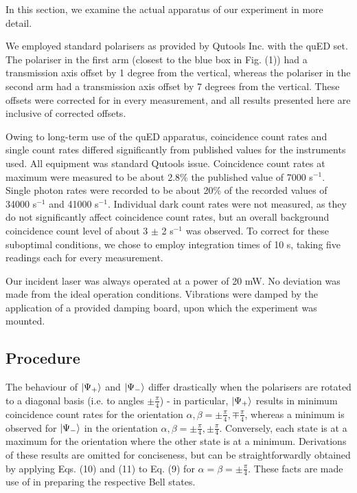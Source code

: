 \documentclass[aps,prl,nofootinbib,twocolumn,superscriptaddress,groupedaddress]{revtex4}  %
\begin{document}
In this section, we examine the actual apparatus of our experiment in more detail. 

We employed standard polarisers as provided by Qutools Inc. with the quED set. The polariser in the first arm (closest to the blue box in Fig. (1)) had a transmission axis offset by 1 degree from the vertical, whereas the polariser in the second arm had a transmission axis offset by 7 degrees from the vertical. These offsets were corrected for in every measurement, and all results presented here are inclusive of corrected offsets.

Owing to long-term use of the quED apparatus, coincidence count rates and single count rates differed significantly from published values\cite{qued} for the instruments used. All equipment was standard Qutools issue. Coincidence count rates at maximum were measured to be about 2.8\% the published value of 7000 s$^{-1}$. Single photon rates were recorded to be about 20\% of the recorded values of 34000 s$^{-1}$ and 41000 s$^{-1}$. Individual dark count rates were not measured, as they do not significantly affect coincidence count rates, but an overall background coincidence count level of about 3 $\pm$ 2 s$^{-1}$ was observed. To correct for these suboptimal conditions, we chose to employ integration times of 10 s, taking five readings each for every measurement. 

Our incident laser was always operated at a power of 20 mW. No deviation was made from the ideal operation conditions. Vibrations were damped by the application of a provided damping board, upon which the experiment was mounted.

\subsection{Procedure}
The behaviour of $\ket{\Psi_{+}}$ and $\ket{\Psi_{-}}$ differ drastically when the polarisers are rotated to a diagonal basis (i.e. to angles $\pm\frac{\pi}{4}$) - in particular, $\ket{\Psi_{+}}$ results in minimum coincidence count rates for the orientation $\alpha, \beta = \pm \frac{\pi}{4}, \mp \frac{\pi}{4}$, whereas a minimum is observed for $\ket{\Psi_{-}}$ in the orientation $\alpha, \beta = \pm \frac{\pi}{4}, \pm \frac{\pi}{4}$. Conversely, each state is at a maximum for the orientation where the other state is at a minimum. Derivations of these results are omitted for conciseness, but can be straightforwardly obtained by applying Eqs. (10) and (11) to Eq. (9) for $\alpha = \beta = \pm \frac{\pi}{4}$. These facts are made use of in preparing the respective Bell states. 
\end{document}
